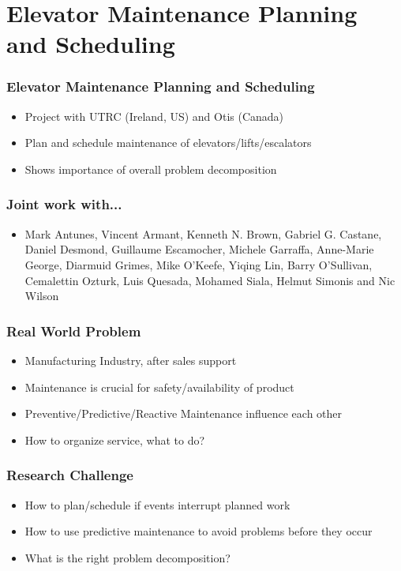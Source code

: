 \section{Elevator Maintenance Planning and Scheduling}

\begin{frame}
\frametitle{Elevator Maintenance Planning and Scheduling}
\begin{itemize}
\item Project with UTRC (Ireland, US) and Otis (Canada)
\item Plan and schedule maintenance of elevators/lifts/escalators
\item Shows importance of overall problem decomposition
\end{itemize}
\end{frame}

\begin{frame}
\frametitle{Joint work with...}
\begin{itemize}
\item Mark Antunes, Vincent Armant, Kenneth N. Brown, Gabriel G. Castane, Daniel Desmond,
Guillaume Escamocher, Michele Garraffa, Anne-Marie George, Diarmuid Grimes, Mike O'Keefe, Yiqing Lin,
Barry O'Sullivan, Cemalettin Ozturk, Luis Quesada, Mohamed Siala, Helmut Simonis
and Nic Wilson
\end{itemize}
\end{frame}


\begin{frame}
\frametitle{Real World Problem}
\begin{itemize}
\item Manufacturing Industry, after sales support
\item Maintenance is crucial for safety/availability of product
\item Preventive/Predictive/Reactive Maintenance influence each other
\item  How to organize service, what to do?
\end{itemize}
\end{frame}

\begin{frame}
\frametitle{Research Challenge}
\begin{itemize}
\item How to plan/schedule if events interrupt planned work
\item How to use predictive maintenance to avoid problems before they occur
\item What is the right problem decomposition?
\end{itemize}
\end{frame}

